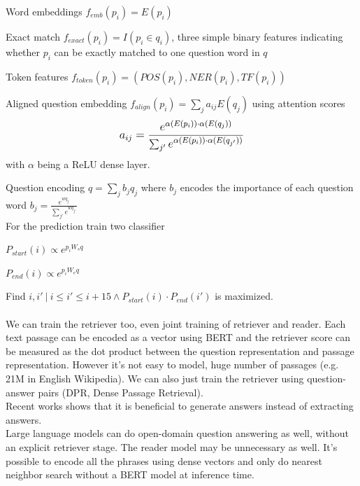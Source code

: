 \documentclass[10pt]{report}
\begin{document}
\begin{list}{}{}
	\item Word embeddings $f_{emb}(p_i) = E(p_i)$
	\item Exact match $f_{exact}(p_i) = I(p_i \in q_i)$, three simple binary features indicating whether $p_i$ can be exactly matched to one question word in $q$
	\item Token features $f_{token}(p_i) = (POS(p_i), NER(p_i), TF(p_i))$
	\item Aligned question embedding $f_{align}(p_i) = \sum_j a_{ij}E(q_j)$ using attention scores $$\mathlarger{a_{ij}=\frac{e^{\alpha(E(p_i))\cdot\alpha(E(q_j))}}{\sum_{j'}e^{\alpha(E(p_i))\cdot\alpha(E(q_{j'}))}}}$$ with $\alpha$ being a ReLU dense layer.
\end{list}
Question encoding $q=\sum_jb_jq_j$ where $b_j$ encodes the importance of each question word $b_j=\frac{e^{wq_j}}{\sum_{j'} e^{wq_{j'}}}$\\
For the prediction train two classifier\begin{list}{}{}
	\item $P_{start}(i)\propto e^{p_iW_sq}$
	\item $P_{end}(i)\propto e^{p_iW_eq}$
\end{list}
Find $i,i'\:|\:i\leq i'\leq i+15\wedge P_{start}(i)\cdot P_{end}(i')$ is maximized.\\\\
We can train the retriever too, even joint training of retriever and reader. Each text passage can be encoded as a vector using BERT and the retriever score can be measured as the dot product between the question representation and passage representation. However it's not easy to model, huge number of passages (e.g. 21M in English Wikipedia). We can also just train the retriever using question-answer pairs (DPR, Dense Passage Retrieval).\\
Recent works shows that it is beneficial to generate answers instead of extracting answers.\\
Large language models can do open-domain question answering as well, without an explicit retriever stage. The reader model may be unnecessary as well. It's possible to encode all the phrases using dense vectors and only do nearest neighbor search without a BERT model at inference time.
\end{document}
